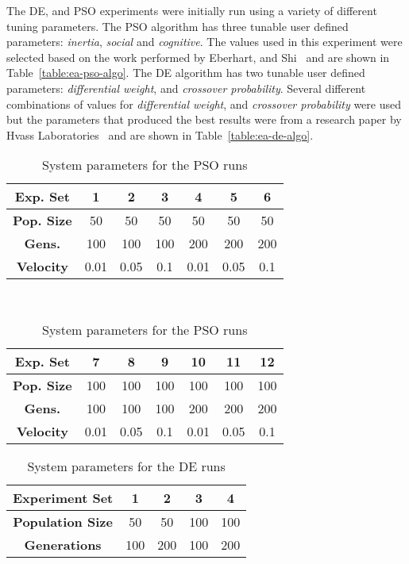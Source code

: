 The DE, and PSO experiments were initially run using a variety of different tuning parameters. The PSO algorithm has three tunable user defined parameters: \textit{inertia}, \textit{social} and \textit{cognitive}. The values used in this experiment were selected based on the work performed by Eberhart, and Shi~\cite{eberhart2000comparing} and are shown in Table~\ref{table:ea-pso-algo}. The DE algorithm has two tunable user defined parameters: \textit{differential weight}, and \textit{crossover probability}. Several different combinations of values for \textit{differential weight}, and \textit{crossover probability} were used but the parameters that produced the best results were from a research paper by Hvass Laboratories~\cite{pedersen2010good} and are shown in Table~\ref{table:ea-de-algo}.

\begin{table}
	\centering
	\begin{tabular}{ | >{\bfseries}c | c | c | c | c | c | c | }
		\hline
		Exp. Set & 1 & 2 & 3 & 4 & 5 & 6 \\ \hline
		Pop. Size & 50 & 50 & 50 & 50 & 50 & 50 \\ \hline
		Gens. & 100 & 100 & 100 & 200 & 200 & 200 \\ \hline
		Velocity & 0.01 & 0.05 & 0.1 & 0.01 & 0.05 & 0.1 \\ \hline
	\end{tabular}
	\\
	\vspace{3 mm}
	\begin{tabular}{ | >{\bfseries}c | c | c | c | c | c | c | }
		\hline
		Exp. Set & 7 & 8 & 9 & 10 & 11 & 12 \\ \hline
		Pop. Size & 100 & 100 & 100 & 100 & 100 & 100 \\ \hline
		Gens. & 100 & 100 & 100 & 200 & 200 & 200 \\ \hline
		Velocity & 0.01 & 0.05 & 0.1 & 0.01 & 0.05 & 0.1 \\ \hline
	\end{tabular}
	\caption{System parameters for the PSO runs}
	\label{table:ea-pso}
\end{table}

\begin{table}
	\centering
	\begin{tabular}{ | >{\bfseries}c | c | c | c | c | }
		\hline
		Experiment Set & 1 & 2 & 3 & 4 \\ \hline
		Population Size & 50 & 50 & 100 & 100 \\ \hline
		Generations & 100 & 200 & 100 & 200 \\ \hline
	\end{tabular}
	\caption{System parameters for the DE runs}
	\label{table:ea-de}
\end{table}

